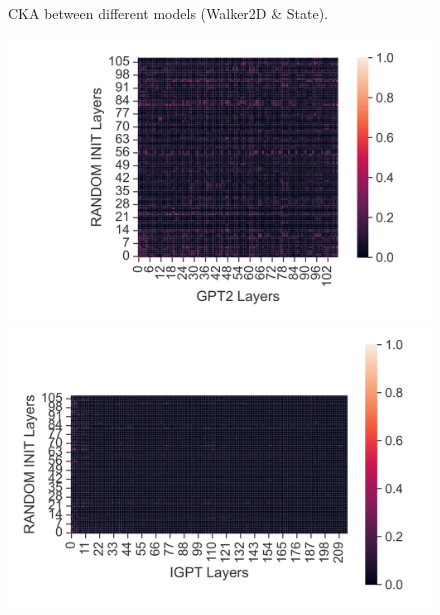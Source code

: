 \documentclass{article}
\begin{document}
\begin{figure}[H]
\begin{minipage}[b]{0.32\linewidth}
    \end{minipage}
    \caption{CKA between different models (Walker2D \& State).}
\end{figure}

\begin{figure}[H]
    \centering
    \begin{minipage}[b]{0.32\linewidth}
        \includegraphics[width=\linewidth]{figs/cka_40_40_dtgpt2_walker2d_medium_666_reward.png}
    \end{minipage}
    \begin{minipage}[b]{0.32\linewidth}
        \includegraphics[width=\linewidth]{figs/cka_40_40_dtigpt_walker2d_medium_666_reward.png}
    \end{minipage}
    \begin{minipage}[b]{0.32\linewidth}

\end{minipage}
\end{figure}
\end{document}
